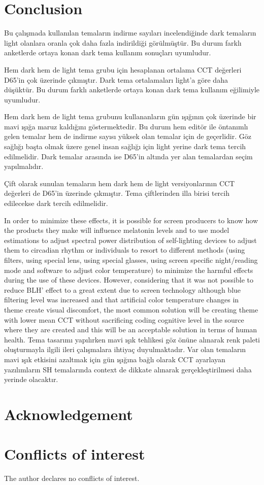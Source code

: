 \documentclass{article}
\begin{document}
\section{Conclusion}
Bu çalışmada kullanılan temaların indirme sayıları incelendiğinde dark temaların light olanlara oranla çok daha fazla indirildiği görülmüştür. Bu durum farklı anketlerde ortaya konan dark tema kullanım sonuçları uyumludur.

Hem dark hem de light tema grubu için hesaplanan ortalama CCT değerleri D65'in çok üzerinde çıkmıştır. Dark tema ortalamaları light'a göre daha düşüktür. Bu durum farklı anketlerde ortaya konan dark tema kullanım eğilimiyle uyumludur.

Hem dark hem de light tema grubunu kullananların gün ışığının çok üzerinde bir mavi ışığa maruz kaldığını göstermektedir. Bu durum hem editör ile öntanımlı gelen temalar hem de indirme sayısı yüksek olan temalar için de geçerlidir. Göz sağlığı başta olmak üzere genel insan sağlığı için light yerine dark tema tercih edilmelidir. Dark temalar arasında ise D65'in altında yer alan temalardan seçim yapılmalıdır.

Çift olarak sunulan temaların hem dark hem de light versiyonlarının CCT değerleri de D65'in üzerinde çıkmıştır. Tema çiftlerinden illa birisi tercih edilecekse dark tercih edilmelidir.

In order to minimize these effects, it is possible for screen producers to know how the  products they make will influence melatonin levels and to use model estimations to adjust spectral power distribution of self-lighting devices to adjust them to circadian rhythm or individuals to resort to different methods (using filters, using special lens, using special glasses, using screen specific night/reading mode and software to adjust color temperature) to minimize the harmful effects during the use of these devices. However, considering that it was not possible to reduce BLH' effect to a great extent due to screen technology although blue filtering level was increased and that artificial color temperature changes in theme create visual discomfort, the most common solution will be creating theme with lower mean CCT without sacrificing coding cognitive level in the source where they are created and this will be an acceptable solution in terms of human health. Tema tasarımı yapılırken mavi ışık tehlikesi göz önüne alınarak renk paleti oluşturmayla ilgili ileri çalışmalara ihtiyaç duyulmaktadır. Var olan temaların mavi ışık etkisini azaltmak için gün ışığına bağlı olarak CCT ayarlayan yazılımların SH temalarında context de dikkate alınarak gerçekleştirilmesi daha yerinde olacaktır.

\section*{Acknowledgement}
\section*{Conflicts of interest}
The author declares no conflicts of interest.



\end{document}
